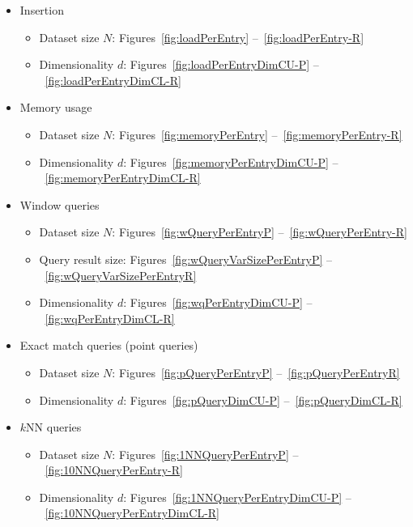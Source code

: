\documentclass{vldb}
\begin{document}
\begin{itemize}
	\item Insertion 
	\begin{itemize}
		\item Dataset size $N$: Figures~\ref{fig:loadPerEntry} --~\ref{fig:loadPerEntry-R}
		\item Dimensionality $d$: Figures~\ref{fig:loadPerEntryDimCU-P} --~\ref{fig:loadPerEntryDimCL-R}
	\end{itemize}
	
	\item Memory usage %
	\begin{itemize}
		\item Dataset size $N$: Figures~\ref{fig:memoryPerEntry} --~\ref{fig:memoryPerEntry-R}
		\item Dimensionality $d$: Figures~\ref{fig:memoryPerEntryDimCU-P} --~\ref{fig:memoryPerEntryDimCL-R}
	\end{itemize}
	
	\item Window queries %
	\begin{itemize}
		\item Dataset size $N$: Figures~\ref{fig:wQueryPerEntryP} --~\ref{fig:wQueryPerEntry-R}
		\item Query result size: Figures~\ref{fig:wQueryVarSizePerEntryP} --~\ref{fig:wQueryVarSizePerEntryR}
		\item Dimensionality $d$: Figures~\ref{fig:wqPerEntryDimCU-P} --~\ref{fig:wqPerEntryDimCL-R}
	\end{itemize}
	
	\item Exact match queries (point queries) %
	\begin{itemize}
		\item Dataset size $N$: Figures~\ref{fig:pQueryPerEntryP} --~\ref{fig:pQueryPerEntryR}
		\item Dimensionality $d$: Figures~\ref{fig:pQueryDimCU-P} --~\ref{fig:pQueryDimCL-R}
	\end{itemize}
	
	\item $k$NN queries %
	\begin{itemize}
		\item Dataset size $N$: Figures~\ref{fig:1NNQueryPerEntryP} --~\ref{fig:10NNQueryPerEntry-R}
		\item Dimensionality $d$: Figures~\ref{fig:1NNQueryPerEntryDimCU-P} --~\ref{fig:10NNQueryPerEntryDimCL-R}
	\end{itemize}
	

\end{itemize}
\end{document}
